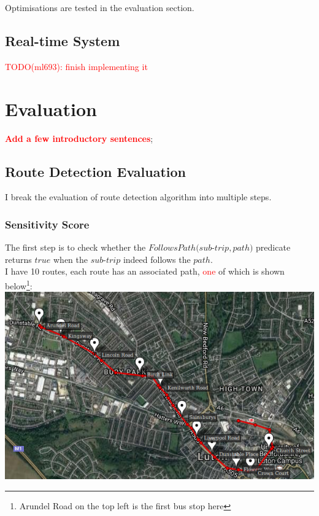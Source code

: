 \documentclass[12pt,a4paper,oneside,openright]{report}
\begin{document}
Optimisations are tested in the evaluation section.



\section{Real-time System}


\textcolor{red}{TODO(ml693): finish implementing it}



\chapter{Evaluation}

\textcolor{red}{\textbf{Add a few introductory sentences}};

\section{Route Detection Evaluation}

I break the evaluation of route detection algorithm into multiple steps.

\subsection{Sensitivity Score}

The first step is to check whether the 
$FollowsPath(sub$-$trip, path)$ predicate returns $true$ when the $sub$-$trip$
indeed follows the $path$. \\

I have 10 routes, each route has an associated path,
\textcolor{red}{one} of which is shown 
below\footnote{Arundel Road on the top left is the first bus stop here}: \\
\includegraphics[scale = 0.7]{figs/full_route.png} \\
\end{document}

